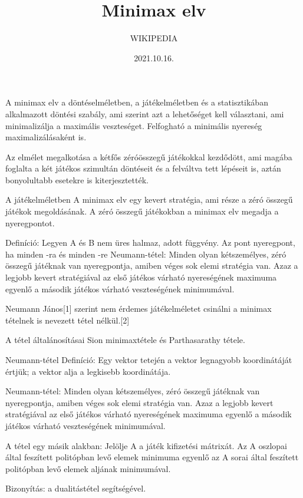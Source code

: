 \documentclass  [12pt]{article}
\author {WIKIPEDIA}
\date{2021.10.16.}
\title{Minimax elv }
\begin{document}
	\begin{titlepage}
    		\maketitle
	\end{titlepage}



A minimax elv a döntéselméletben, a játékelméletben és a statisztikában alkalmazott döntési szabály, ami szerint azt a lehetőséget kell választani, ami minimalizálja a maximális veszteséget. Felfogható a minimális nyereség maximalizálásaként is.

Az elmélet megalkotása a kétfős zéróösszegű játékokkal kezdődött, ami magába foglalta a két játékos szimultán döntéseit és a felváltva tett lépéseit is, aztán bonyolultabb esetekre is kiterjesztették.

A játékelméletben
A minimax elv egy kevert stratégia, ami része a zéró összegű játékok megoldásának. A zéró összegű játékokban a minimax elv megadja a nyeregpontot.

Definíció: Legyen A és B nem üres halmaz,   adott függvény. Az   pont nyeregpont, ha minden  -ra és minden  -re  
Neumann-tétel: Minden olyan kétszemélyes, zéró összegű játéknak van nyeregpontja, amiben véges sok elemi stratégia van. Azaz a legjobb kevert stratégiával az első játékos várható nyereségének maximuma egyenlő a második játékos várható veszteségének minimumával.

Neumann János[1] szerint nem érdemes játékelméletet csinálni a minimax tételnek is nevezett tétel nélkül.[2]

A tétel általánosításai Sion minimaxtétele és Parthasarathy tétele.

Neumann-tétel
Definíció: Egy vektor tetején a vektor legnagyobb koordinátáját értjük; a vektor alja a legkisebb koordinátája.

Neumann-tétel: Minden olyan kétszemélyes, zéró összegű játéknak van nyeregpontja, amiben véges sok elemi stratégia van. Azaz a legjobb kevert stratégiával az első játékos várható nyereségének maximuma egyenlő a második játékos várható veszteségének minimumával.

A tétel egy másik alakban: Jelölje A a játék kifizetési mátrixát. Az A oszlopai által feszített politópban levő elemek minimuma egyenlő az A sorai által feszített politópban levő elemek aljának minimumával.

Bizonyítás: a dualitástétel segítségével.


\end{document}

